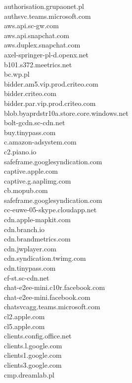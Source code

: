 \documentclass[12pt,a4paper]{article}
\begin{document}
\begin{scriptsize}
\begin{multicols}{3}
\begin{center}
                    authorisation.grupaonet.pl\\authsvc.teams.microsoft.com\\aws.api.sc-gw.com\\aws.api.snapchat.com\\
                    aws.duplex.snapchat.com\\axel-springer-pl-d.openx.net\\b101.s372.meetrics.net\\bc.wp.pl\\
                    bidder.am5.vip.prod.criteo.com\\bidder.criteo.com\\bidder.par.vip.prod.criteo.com\\
                    blob.byaprdstr10a.store.core.windows.net\\bolt-gcdn.sc-cdn.net\\buy.tinypass.com\\c.amazon-adsystem.com\\
                    c2.piano.io\\safeframe.googlesyndication.com\\captive.apple.com\\
                    captive.g.aaplimg.com\\cb.mopub.com\\safeframe.googlesyndication.com\\
                    cc-euwe-05-skype.cloudapp.net\\cdn.apple-mapkit.com\\cdn.branch.io\\cdn.brandmetrics.com\\cdn.jwplayer.com\\
                    cdn.syndication.twimg.com\\cdn.tinypass.com\\cf-st.sc-cdn.net\\chat-e2ee-mini.c10r.facebook.com\\
                    chat-e2ee-mini.facebook.com\\chatsvcagg.teams.microsoft.com\\cl2.apple.com\\cl5.apple.com\\
                    clients.config.office.net\\clients.l.google.com\\clients1.google.com\\clients3.google.com\\cmp.dreamlab.pl\\

\end{center}
\end{multicols}
\end{scriptsize}
\end{document}
